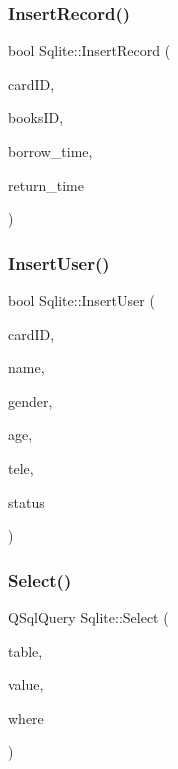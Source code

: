 \mbox{\label{class_sqlite_a7271bf0e8252a9dc0969872faea228b4}} 
\subsubsection{\texorpdfstring{InsertRecord()}{InsertRecord()}}
{\footnotesize\ttfamily bool Sqlite\+::\+Insert\+Record (\begin{DoxyParamCaption}\item[{Q\+String}]{card\+ID,  }\item[{Q\+String}]{books\+ID,  }\item[{Q\+String}]{borrow\+\_\+time,  }\item[{Q\+String}]{return\+\_\+time }\end{DoxyParamCaption})}

\mbox{\label{class_sqlite_aaaa7d53dd288728640cde95e264f31f1}} 
\subsubsection{\texorpdfstring{InsertUser()}{InsertUser()}}
{\footnotesize\ttfamily bool Sqlite\+::\+Insert\+User (\begin{DoxyParamCaption}\item[{Q\+String}]{card\+ID,  }\item[{Q\+String}]{name,  }\item[{Q\+String}]{gender,  }\item[{int}]{age,  }\item[{Q\+String}]{tele,  }\item[{bool}]{status }\end{DoxyParamCaption})}

\mbox{\label{class_sqlite_a9a39cca147a504c82e98261707aa1e8d}} 
\subsubsection{\texorpdfstring{Select()}{Select()}}
{\footnotesize\ttfamily Q\+Sql\+Query Sqlite\+::\+Select (\begin{DoxyParamCaption}\item[{Q\+String}]{table,  }\item[{Q\+String}]{value,  }\item[{Q\+String}]{where }\end{DoxyParamCaption})}

